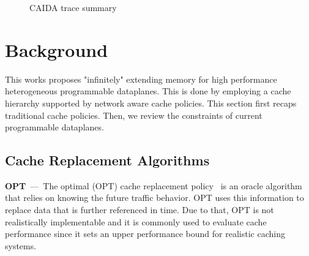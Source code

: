 \begin{figure}[]
  \begin{adjustwidth}{-0.45cm}{}
	\centering
	\caption{CAIDA trace summary}
	\label{fig:traces}
	\end{adjustwidth}
\end{figure}

\section{Background}\label{sec:back}
This works proposes "infinitely" extending memory for high performance heterogeneous programmable dataplanes.
This is done by employing a cache hierarchy supported by network aware cache policies.
This section first recaps traditional cache policies. 
Then, we review the constraints of current programmable dataplanes.

\subsection{Cache Replacement Algorithms}
\textbf{OPT}~---~The optimal (OPT) cache replacement policy~\cite{Belady:66} is an oracle algorithm that relies on knowing the future traffic behavior.
OPT uses this information to replace data that is further referenced in time.
Due to that, OPT is not realistically implementable and it is commonly used to evaluate cache performance since it sets an upper performance bound for realistic caching systems.

